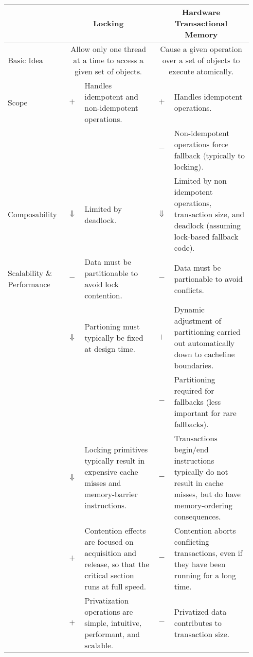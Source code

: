 
\begin{table*}[p]
\begin{center}
\begin{tabular}{p{1.0in}||c|p{2.0in}||c|p{2.0in}}
& \multicolumn{2}{c||}{Locking} & \multicolumn{2}{c}{Hardware Transactional Memory} \\
\hline
\hline
Basic Idea
	& \multicolumn{2}{p{2.2in}||}{
	  Allow only one thread at a time to access a given set of objects.}
		& \multicolumn{2}{p{2.2in}}{
		  Cause a given operation over a set of objects to execute
		  atomically.} \\
\hline
\hline
Scope
	& $+$
	& Handles idempotent and non-idempotent operations.
		& $+$
		& Handles idempotent operations. \\
\cline{4-5}
	& &
		& $-$
		& Non-idempotent operations force fallback (typically
		  to locking). \\
\hline
Composability
	& $\Downarrow$
	& Limited by deadlock.
		& $\Downarrow$
		& Limited by non-idempotent operations, transaction size,
		  and deadlock (assuming lock-based fallback code). \\
\hline
Scalability \& Performance
	& $-$
	& Data must be partitionable to avoid lock contention.
		& $-$
		& Data must be partionable to avoid conflicts. \\
\cline{2-5}
	& $\Downarrow$
	& Partioning must typically be fixed at design time.
		& $+$
		& Dynamic adjustment of partitioning carried out
		  automatically down to cacheline boundaries. \\
\cline{4-5}
	&
	&
		& $-$
		& Partitioning required for fallbacks (less important
		  for rare fallbacks). \\
\cline{2-5}
	& $\Downarrow$
	& Locking primitives typically result in expensive cache misses
	  and memory-barrier instructions.
		& $-$
		& Transactions begin/end instructions typically do not
		  result in cache misses, but do have memory-ordering
		  consequences. \\
\cline{2-5}
	& $+$
	& Contention effects are focused on acquisition and release, so
	  that the critical section runs at full speed.
		& $-$
		& Contention aborts conflicting transactions, even
		  if they have been running for a long time. \\
\cline{2-5}
	& $+$
	& Privatization operations are simple, intuitive, performant,
	  and scalable.
		& $-$
		& Privatized data contributes to transaction size. \\

\end{tabular}
\end{center}
\end{table*}
